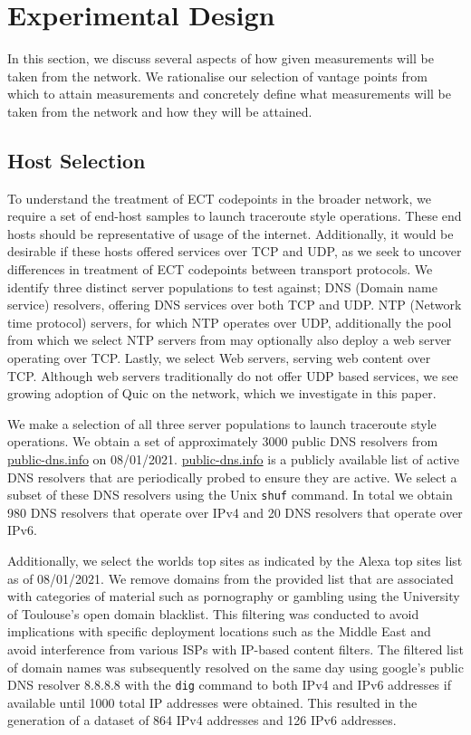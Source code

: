 \documentclass{l4proj}
\begin{document}
\section{Experimental Design}

In this section, we discuss several aspects of how given measurements will be taken from the network. We rationalise our selection of vantage points from which to attain measurements and concretely define what measurements will be taken from the network and how they will be attained.

\subsection{Host Selection}

To understand the treatment of ECT codepoints in the broader network, we require a set of end-host samples to launch traceroute style operations. These end hosts should be representative of usage of the internet. Additionally, it would be desirable if these hosts offered services over TCP and UDP, as we seek to uncover differences in treatment of ECT codepoints between transport protocols. We identify three distinct server populations to test against; DNS (Domain name service) resolvers, offering DNS services over both TCP and UDP. NTP (Network time protocol) servers, for which NTP operates over UDP, additionally the pool from which we select NTP servers from may optionally also deploy a web server operating over TCP. Lastly, we select Web servers, serving web content over TCP. Although web servers traditionally do not offer UDP based services, we see growing adoption of Quic on the network, which we investigate in this paper.

We make a selection of all three server populations to launch traceroute style operations. We obtain a set of approximately 3000 public DNS resolvers from \href{https://public-dns.info}{public-dns.info} on 08/01/2021. \href{https://public-dns.info}{public-dns.info} is a publicly available list of active DNS resolvers that are periodically probed to ensure they are active. We select a subset of these DNS resolvers using the Unix \lstinline{shuf} command. In total we obtain 980 DNS resolvers that operate over IPv4 and 20 DNS resolvers that operate over IPv6.

Additionally, we select the worlds top sites as indicated by the Alexa top sites list as of 08/01/2021. We remove domains from the provided list that are associated with categories of material such as pornography or gambling using the University of Toulouse's open domain blacklist. This filtering was conducted to avoid implications with specific deployment locations such as the Middle East and avoid interference from various ISPs with IP-based content filters. The filtered list of domain names was subsequently resolved on the same day using google's public DNS resolver 8.8.8.8 with the \lstinline{dig} command to both IPv4 and IPv6 addresses if available until 1000 total IP addresses were obtained. This resulted in the generation of a dataset of 864 IPv4 addresses and 126 IPv6 addresses.
\end{document}
